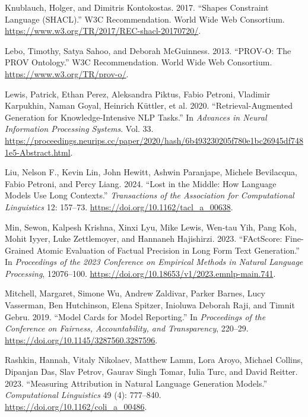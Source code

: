 \documentclass[
  11pt,
]{article}
\newlength{\cslhangindent}
\newenvironment{CSLReferences}[2] %
 {\begin{list}{}{%
  \setlength{\itemindent}{0pt}
  \setlength{\leftmargin}{0pt}
  \setlength{\parsep}{0pt}
  \ifodd #1
   \setlength{\leftmargin}{\cslhangindent}
   \setlength{\itemindent}{-1\cslhangindent}
  \fi
  \setlength{\itemsep}{#2\baselineskip}}}
 {\end{list}}
\begin{document}
\begin{CSLReferences}{1}{0}
Knublauch, Holger, and Dimitris Kontokostas. 2017. {``Shapes Constraint
Language (SHACL).''} W3C Recommendation. World Wide Web Consortium.
\url{https://www.w3.org/TR/2017/REC-shacl-20170720/}.

Lebo, Timothy, Satya Sahoo, and Deborah McGuinness. 2013. {``PROV-O: The
PROV Ontology.''} W3C Recommendation. World Wide Web Consortium.
\url{https://www.w3.org/TR/prov-o/}.

Lewis, Patrick, Ethan Perez, Aleksandra Piktus, Fabio Petroni, Vladimir
Karpukhin, Naman Goyal, Heinrich Küttler, et al. 2020.
{``Retrieval-Augmented Generation for Knowledge-Intensive NLP Tasks.''}
In \emph{Advances in Neural Information Processing Systems}. Vol. 33.
\url{https://proceedings.neurips.cc/paper/2020/hash/6b493230205f780e1bc26945df7481e5-Abstract.html}.

Liu, Nelson F., Kevin Lin, John Hewitt, Ashwin Paranjape, Michele
Bevilacqua, Fabio Petroni, and Percy Liang. 2024. {``Lost in the Middle:
How Language Models Use Long Contexts.''} \emph{Transactions of the
Association for Computational Linguistics} 12: 157--73.
\url{https://doi.org/10.1162/tacl_a_00638}.

Min, Sewon, Kalpesh Krishna, Xinxi Lyu, Mike Lewis, Wen-tau Yih, Pang
Koh, Mohit Iyyer, Luke Zettlemoyer, and Hannaneh Hajishirzi. 2023.
{``FActScore: Fine-Grained Atomic Evaluation of Factual Precision in
Long Form Text Generation.''} In \emph{Proceedings of the 2023
Conference on Empirical Methods in Natural Language Processing},
12076--100. \url{https://doi.org/10.18653/v1/2023.emnlp-main.741}.

Mitchell, Margaret, Simone Wu, Andrew Zaldivar, Parker Barnes, Lucy
Vasserman, Ben Hutchinson, Elena Spitzer, Inioluwa Deborah Raji, and
Timnit Gebru. 2019. {``Model Cards for Model Reporting.''} In
\emph{Proceedings of the Conference on Fairness, Accountability, and
Transparency}, 220--29. \url{https://doi.org/10.1145/3287560.3287596}.

Rashkin, Hannah, Vitaly Nikolaev, Matthew Lamm, Lora Aroyo, Michael
Collins, Dipanjan Das, Slav Petrov, Gaurav Singh Tomar, Iulia Turc, and
David Reitter. 2023. {``Measuring Attribution in Natural Language
Generation Models.''} \emph{Computational Linguistics} 49 (4): 777--840.
\url{https://doi.org/10.1162/coli_a_00486}.


\end{CSLReferences}
\end{document}
